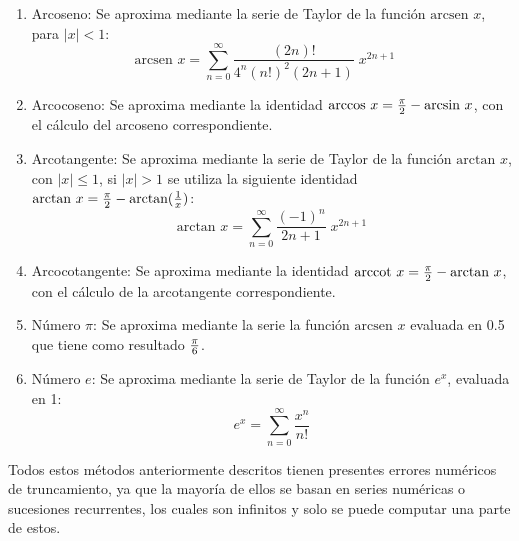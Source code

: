 \documentclass[a4paper,10pt,twocolumn]{article}
\begin{document}
\begin{enumerate}
	\item Arcoseno: Se aproxima mediante la serie de Taylor de la función $\text{arcsen }x$, para $\left|x\right|<1$:
	      \begin{equation}
		      \text{arcsen }x=\sum _{n=0}^{\infty }{\frac {(2n)!}{4^{n}(n!)^{2}(2n+1)}}\;x^{2n+1}\quad
	      \end{equation}
	      
	\item Arcocoseno: Se aproxima mediante la identidad $\text{arccos }x={\pi \over 2}-\text{arcsin }x$, con el cálculo del arcoseno correspondiente.
	      
	\item Arcotangente: Se aproxima mediante la serie de Taylor de la función $\text{arctan }x$, con $|x| \leq 1$, si $|x| > 1$ se utiliza la siguiente identidad $\text{arctan }x={\pi \over 2}-\text{arctan}({1 \over x})$:
	      \begin{equation}
		      \text{arctan }x=\sum _{n=0}^{\infty }{\frac {(-1)^{n}}{2n+1}}\;x^{2n+1}
	      \end{equation}
	      
	\item Arcocotangente: Se aproxima mediante la identidad $\text{arccot }x={\pi \over 2}-\text{arctan }x$, con el cálculo de la arcotangente correspondiente.
	      
	\item Número $\pi$: Se aproxima mediante la serie la función $\text{arcsen }x$ evaluada en 0.5 que tiene como resultado $\pi\over 6$.
	      
	\item Número $e$: Se aproxima mediante la serie de Taylor de la función $e^x$, evaluada en 1:
	      \begin{equation}
		      e^{x}=\sum _{n=0}^{\infty }{\frac {x^{n}}{n!}}
	      \end{equation}
\end{enumerate}

Todos estos métodos anteriormente descritos tienen presentes errores numéricos de truncamiento, ya que la mayoría de ellos se basan en series numéricas o sucesiones recurrentes, los cuales son infinitos y solo se puede computar una parte de estos.


\end{document}
